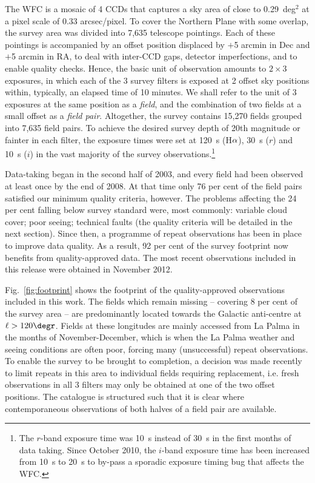 \documentclass[a4paper,useAMS,usenatbib]{mn2e}
\def\ha{\mbox{H$\rm \alpha$}}
\begin{document}
The WFC is a mosaic of 4 CCDs 
that captures a sky area of close to 0.29~deg$^2$ at a pixel scale of
0.33 arcsec/pixel.
To cover the Northern Plane with some overlap,
the survey area was divided into 7,635 telescope pointings.
Each of these pointings is accompanied by an offset position
displaced by $+$5 arcmin in Dec 
and $+$5 arcmin in RA,
to deal with inter-CCD gaps, detector imperfections,
and to enable quality checks. 
Hence, the basic unit of observation
amounts to $2 \times 3$ exposures, 
in which each of the 3 survey filters is exposed at 2 offset sky positions 
within, typically, an elapsed time of 10 minutes.
We shall refer to the unit of 3 exposures at the same position 
as a \emph{field},
and the combination of two fields at a small offset as a \emph{field pair}.
Altogether, the survey contains 15,270 fields
grouped into 7,635 field pairs.
To achieve the desired survey depth
of 20th magnitude or fainter in each filter, 
the exposure times were set at 120~s (\ha), 
30~s ($r$) and 10~s ($i$)
in the vast majority of the survey observations.\footnote{The $r$-band exposure time was 10~s instead of 30~s in the first months of data taking. Since October 2010, the $i$-band exposure time 
has been increased from 10~s to 20~s to by-pass a sporadic exposure timing bug that affects the WFC.}

Data-taking began in the second half of 2003, 
and every field had been observed at least once by the end of 2008.
At that time only 76 per cent of the field pairs 
satisfied our minimum quality criteria, however.
The problems affecting the 24 per cent falling below survey standard were,
most commonly: variable cloud cover;
poor seeing; technical faults
(the quality criteria will be detailed in the next section).
Since then, a programme of repeat observations has been in place 
to improve data quality. 
As a result, 92 per cent of the survey footprint
now benefits from quality-approved data.
The most recent observations included in this release
were obtained in November 2012.

Fig.~\ref{fig:footprint} shows the footprint
of the quality-approved observations included in this work. 
The fields which remain missing 
-- covering 8 per cent of the survey area --
are predominantly located towards the Galactic anti-centre 
at $\ell > 120\degr$.
Fields at these longitudes are mainly accessed from La Palma 
in the months of November-December,
which is when the La Palma weather and seeing conditions are often poor,
forcing many (unsuccessful) repeat observations.
To enable the survey to be brought to completion, 
a decision was made recently to limit repeats in this area 
to individual fields requiring replacement,
i.e. fresh observations in all 3 filters may only be obtained 
at one of the two offset positions.  
The catalogue is structured such that it is clear 
where contemporaneous observations of both halves of a field pair
are available.
\end{document}

